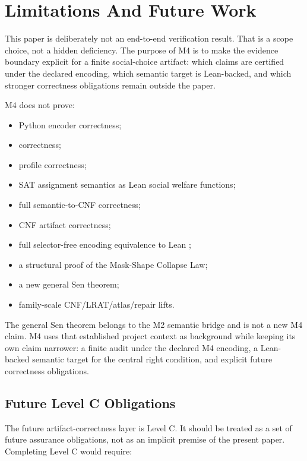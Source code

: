 \section{Limitations And Future Work}
\label{sec:limitations}

This paper is deliberately not an end-to-end verification result. That is a
scope choice, not a hidden deficiency. The purpose of M4 is to make the
evidence boundary explicit for a finite social-choice artifact: which claims
are certified under the declared encoding, which semantic target is
Lean-backed, and which stronger correctness obligations remain outside the
paper.

M4 does not prove:

\begin{itemize}[leftmargin=*]
\item Python encoder correctness;
\item {} correctness;
\item {} profile correctness;
\item SAT assignment semantics as Lean social welfare functions;
\item full semantic-to-CNF correctness;
\item CNF artifact correctness;
\item full selector-free encoding equivalence to Lean ;
\item a structural proof of the Mask-Shape Collapse Law;
\item a new general Sen theorem;
\item family-scale CNF/LRAT/atlas/repair lifts.
\end{itemize}

The general Sen theorem belongs to the M2 semantic bridge and is not a new M4
claim. M4 uses that established project context as background while keeping
its own claim narrower: a finite audit under the declared M4 encoding, a
Lean-backed semantic target for the central right condition, and explicit
future correctness obligations.

\subsection*{Future Level C Obligations}

The future artifact-correctness layer is Level C. It should be treated as a
set of future assurance obligations, not as an implicit premise of the present
paper. Completing Level C would require:

